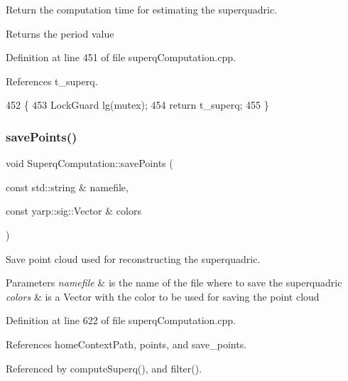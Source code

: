 Return the computation time for estimating the superquadric. 

\begin{DoxyReturn}{Returns}
the period value 
\end{DoxyReturn}


Definition at line 451 of file superq\+Computation.\+cpp.



References t\+\_\+superq.


\begin{DoxyCode}
452 \{   
453     LockGuard lg(mutex);
454     \textcolor{keywordflow}{return} t_superq;
455 \}
\end{DoxyCode}
\mbox{\label{classSuperqComputation_ab8912bb805cf979007985ffb553d43b0}} 
\subsubsection{\texorpdfstring{save\+Points()}{savePoints()}}
{\footnotesize\ttfamily void Superq\+Computation\+::save\+Points (\begin{DoxyParamCaption}\item[{const std\+::string \&}]{namefile,  }\item[{const yarp\+::sig\+::\+Vector \&}]{colors }\end{DoxyParamCaption})}



Save point cloud used for reconstructing the superquadric. 


\begin{DoxyParams}{Parameters}
{\em namefile} & is the name of the file where to save the superquadric \\
\hline
{\em colors} & is a Vector with the color to be used for saving the point cloud \\
\hline
\end{DoxyParams}


Definition at line 622 of file superq\+Computation.\+cpp.



References home\+Context\+Path, points, and save\+\_\+points.



Referenced by compute\+Superq(), and filter().


